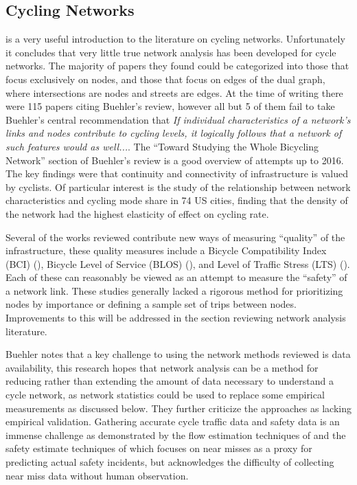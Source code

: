 \subsection{Cycling Networks}

\cite{buehler2016bikeway} is a very useful introduction to the literature on cycling networks. Unfortunately it concludes that very little true network analysis has been developed for cycle networks. The majority of papers they found could be categorized into those that focus exclusively on nodes, and those that focus on edges of the dual graph, where intersections are nodes and streets are edges. At the time of writing there were 115 papers citing Buehler's review, however all but 5 of them fail to take Buehler's central recommendation that \textit{If individual characteristics of a network's links and nodes contribute to cycling levels, it logically follows that a network of such features would as well...}. The ``Toward Studying the Whole Bicycling Network'' section of Buehler's review is a good overview of attempts up to 2016. The key findings were that continuity and connectivity of infrastructure is valued by cyclists. Of particular interest is the \cite{schoner2014missing} study of the relationship between network characteristics and cycling mode share in 74 US cities, finding that the density of the network had the highest elasticity of effect on cycling rate. 

Several of the works reviewed contribute new ways of measuring ``quality'' of the infrastructure, these quality measures include a Bicycle Compatibility Index (BCI) (\cite{klobucar2007network}),  Bicycle Level of Service (BLOS) (\cite{lowry2012assessment}), and Level of Traffic Stress (LTS) (\cite{mekuria2012low}). Each of these can reasonably be viewed as an attempt to measure the ``safety'' of a network link. These studies generally lacked a rigorous method for prioritizing nodes by importance or defining a sample set of trips between nodes. Improvements to this will be addressed in the section reviewing network analysis literature. 

Buehler notes that a key challenge to using the network methods reviewed is data availability, this research hopes that network analysis can be a method for reducing rather than extending the amount of data necessary to understand a cycle network, as network statistics could be used to replace some empirical measurements as discussed below.  They further criticize the approaches as lacking empirical validation. Gathering accurate cycle traffic data and safety data is an immense challenge as demonstrated by the flow estimation techniques of \cite{gosse2014estimating} and the safety estimate techniques of \cite{puchades2018role} which focuses on near misses as a proxy for predicting actual safety incidents, but acknowledges the difficulty of collecting near miss data without human observation. 

